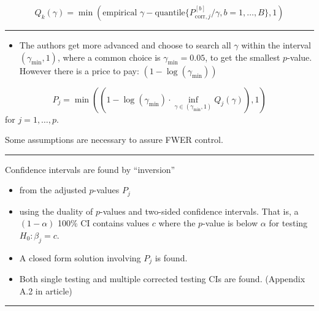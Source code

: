 \documentclass[
  letterpaper,
  DIV=11,
  numbers=noendperiod]{scrartcl}
\providecommand{\tightlist}{%
  \setlength{\itemsep}{0pt}\setlength{\parskip}{0pt}}\usepackage{longtable,booktabs,array}
\begin{document}
\[Q_k(\gamma)=\min(\text{empirical }\gamma- \text{quantile} \{ P_{\text{corr},j}^{[b]}/\gamma,b=1,\ldots, B\},1)\]

\begin{center}\rule{0.5\linewidth}{0.5pt}\end{center}

\begin{itemize}
\tightlist
\item
  The authors get more advanced and choose to search all \(\gamma\)
  within the interval \((\gamma_{\text{min}},1)\), where a common choice
  is \(\gamma_{\text{min}}=0.05\), to get the smallest \(p\)-value.
  However there is a price to pay: \((1-\log(\gamma_{\text{min}}))\)
\end{itemize}

\[ P_j=\min((1-\log(\gamma_{\text{min}})\cdot \inf_{\gamma \in (\gamma_{\text{min}},1)} Q_j(\gamma)),1)\]
for \(j=1,\ldots,p\).

Some assumptions are necessary to assure FWER control.

\begin{center}\rule{0.5\linewidth}{0.5pt}\end{center}

Confidence intervals are found by ``inversion''

\begin{itemize}
\tightlist
\item
  from the adjusted \(p\)-values \(P_j\)
\item
  using the duality of \(p\)-values and two-sided confidence intervals.
  That is, a \((1-\alpha)\) 100\% CI contains values \(c\) where the
  \(p\)-value is below \(\alpha\) for testing \(H_0: \beta_j=c\).
\item
  A closed form solution involving \(P_j\) is found.
\item
  Both single testing and multiple corrected testing CIs are found.
  (Appendix A.2 in article)
\end{itemize}

\begin{center}\rule{0.5\linewidth}{0.5pt}\end{center}
\end{document}
